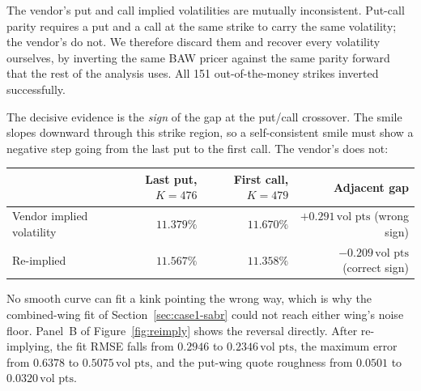 \documentclass[11pt]{article}
\newcommand{\vp}{\,\text{vol pts}}
\begin{document}
The vendor's put and call implied volatilities are mutually inconsistent. Put-call parity
requires a put and a call at the same strike to carry the same volatility; the vendor's
do not. We therefore discard them and recover every volatility ourselves, by inverting
the same BAW pricer against the same parity forward that the rest of the analysis uses.
All 151 out-of-the-money strikes inverted successfully.

The decisive evidence is the \emph{sign} of the gap at the put/call crossover. The smile
slopes downward through this strike region, so a self-consistent smile must show a
negative step going from the last put to the first call. The vendor's does not:

\begin{center}
\small
\begin{tabular}{lrrr}
\toprule
 & Last put, $K=476$ & First call, $K=479$ & Adjacent gap \\
\midrule
Vendor implied volatility & $11.379\%$ & $11.670\%$ & $+0.291\vp$ \quad(wrong sign) \\
Re-implied                & $11.567\%$ & $11.358\%$ & $-0.209\vp$ \quad(correct sign) \\
\bottomrule
\end{tabular}
\end{center}

\noindent No smooth curve can fit a kink pointing the wrong way, which is why the
combined-wing fit of Section~\ref{sec:case1-sabr} could not reach either wing's noise
floor. Panel~B of Figure~\ref{fig:reimply} shows the reversal directly. After
re-implying, the fit RMSE falls from $0.2946$ to $0.2346\vp$, the maximum error from
$0.6378$ to $0.5075\vp$, and the put-wing quote roughness from $0.0501$ to $0.0320\vp$.
\end{document}
